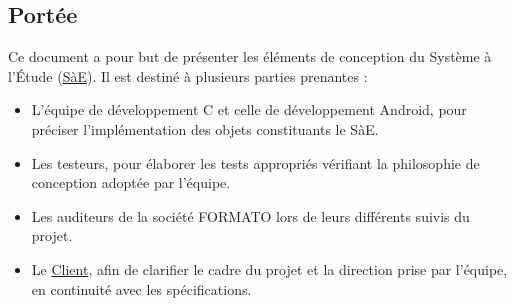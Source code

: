 \subsection{Portée} %
Ce document a pour but de présenter les éléments de conception du Système à l'Étude (\hyperref[SaE]{SàE}). Il est destiné à plusieurs parties prenantes :
\begin{itemize} %
    \item L'équipe de développement C et celle de développement Android, pour préciser l'implémentation des objets constituants le SàE.
    \item Les testeurs, pour élaborer les tests appropriés vérifiant la philosophie de conception adoptée par l'équipe.
    \item Les auditeurs de la société FORMATO lors de leurs différents suivis du projet.
    \item Le \hyperref[client_kereval]{Client}, afin de clarifier le cadre du projet et la direction prise par l'équipe, en continuité avec les spécifications.
\end{itemize}
